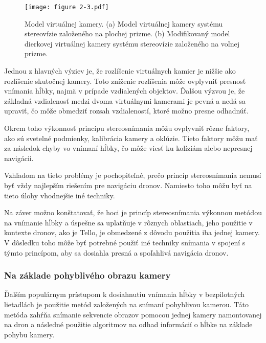 \begin{figure}[ht!]
    \centering
    \texttt{[image: figure 2-3.pdf]}
    \caption{Model virtuálnej kamery. (a) Model virtuálnej kamery systému stereovízie založeného na plochej prizme. (b) Modifikovaný model dierkovej virtuálnej kamery systému stereovízie založeného na voľnej prizme.}
    \label{o:2-3}
\end{figure}

Jednou z hlavných výziev je, že rozlíšenie virtuálnych kamier je nižšie ako rozlíšenie skutočnej kamery. Toto zníženie rozlíšenia môže ovplyvniť presnosť vnímania hĺbky, najmä v prípade vzdialených objektov. Ďalšou výzvou je, že základná vzdialenosť medzi dvoma virtuálnymi kamerami je pevná a nedá sa upraviť, čo môže obmedziť rozsah vzdialeností, ktoré možno presne odhadnúť.

Okrem toho výkonnosť princípu stereosnímania môžu ovplyvniť rôzne faktory, ako sú svetelné podmienky, kalibrácia kamery a oklúzie. Tieto faktory môžu mať za následok chyby vo vnímaní hĺbky, čo môže viesť ku kolíziám alebo nepresnej navigácii.

Vzhľadom na tieto problémy je pochopiteľné, prečo princíp stereosnímania nemusí byť vždy najlepším riešením pre navigáciu dronov. Namiesto toho môžu byť na tieto úlohy vhodnejšie iné techniky.

Na záver možno konštatovať, že hoci je princíp stereosnímania výkonnou metódou na vnímanie hĺbky a úspešne sa uplatňuje v rôznych oblastiach, jeho použitie v kontexte dronov, ako je Tello, je obmedzené z dôvodu použitia iba jednej kamery. V dôsledku toho môže byť potrebné použiť iné techniky snímania v spojení s týmto princípom, aby sa dosiahla presná a spoľahlivá navigácia dronov.

\subsubsection{Na základe pohyblivého obrazu kamery}
Ďalším populárnym prístupom k dosiahnutiu vnímania hĺbky v bezpilotných lietadlách je použitie metód založených na snímaní pohyblivou kamerou. Táto metóda zahŕňa snímanie sekvencie obrazov pomocou jednej kamery namontovanej na dron a následné použitie algoritmov na odhad informácií o hĺbke na základe pohybu kamery.


